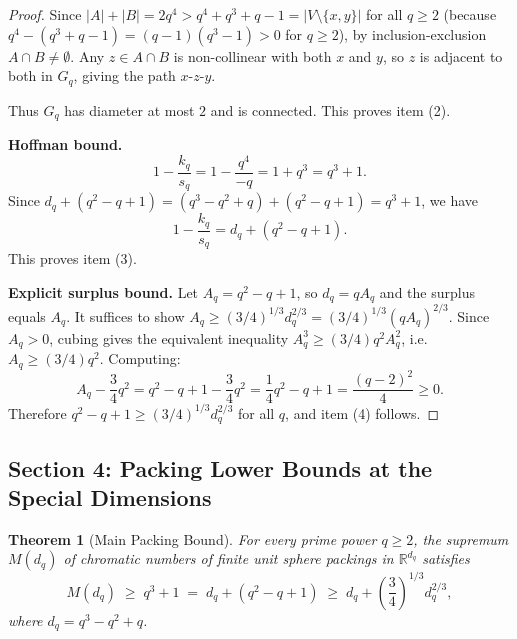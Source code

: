 \documentclass{article}
\newtheorem{theorem}{Theorem}[section]
\theoremstyle{definition}
\begin{document}
\begin{proof}
Since $|A|+|B|=2q^4>q^4+q^3+q-1=|V\setminus\{x,y\}|$ for all $q\ge 2$ (because $q^4-(q^3+q-1)=(q-1)(q^3-1)>0$ for $q\ge 2$), by inclusion-exclusion $A\cap B\ne\emptyset$. Any $z\in A\cap B$ is non-collinear with both $x$ and $y$, so $z$ is adjacent to both in $G_q$, giving the path $x$-$z$-$y$.

Thus $G_q$ has diameter at most $2$ and is connected. This proves item (2).

\textbf{Hoffman bound.}
\[
1-\frac{k_q}{s_q}=1-\frac{q^4}{-q}=1+q^3=q^3+1.
\]
Since $d_q+(q^2-q+1)=(q^3-q^2+q)+(q^2-q+1)=q^3+1$, we have
\[
1-\frac{k_q}{s_q}=d_q+(q^2-q+1).
\]
This proves item (3).

\textbf{Explicit surplus bound.} Let $A_q=q^2-q+1$, so $d_q=qA_q$ and the surplus equals $A_q$. It suffices to show $A_q\ge(3/4)^{1/3}d_q^{2/3}=(3/4)^{1/3}(qA_q)^{2/3}$. Since $A_q>0$, cubing gives the equivalent inequality $A_q^3\ge(3/4)q^2 A_q^2$, i.e.\ $A_q\ge(3/4)q^2$. Computing:
\[
A_q-\frac{3}{4}q^2=q^2-q+1-\frac{3}{4}q^2=\frac{1}{4}q^2-q+1=\frac{(q-2)^2}{4}\ge 0.
\]
Therefore $q^2-q+1\ge(3/4)^{1/3}d_q^{2/3}$ for all $q$, and item (4) follows.
\end{proof}

\subsection*{Section 4: Packing Lower Bounds at the Special Dimensions}

\begin{theorem}[Main Packing Bound]
\label{thm:main-packing}
For every prime power $q\ge 2$, the supremum $M(d_q)$ of chromatic numbers of finite unit sphere packings in $\mathbb{R}^{d_q}$ satisfies
\[
  M(d_q)\;\ge\; q^3+1 \;=\; d_q + (q^2-q+1) \;\ge\; d_q+\left(\frac{3}{4}\right)^{1/3}d_q^{2/3},
\]
where $d_q = q^3-q^2+q$.
\end{theorem}
\end{document}
